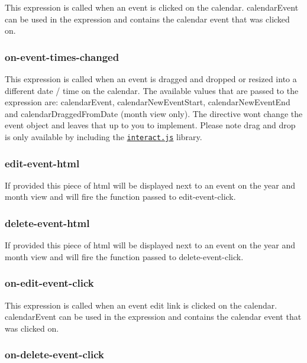 This expression is called when an event is clicked on the calendar. {\ttfamily calendar\+Event} can be used in the expression and contains the calendar event that was clicked on.

\subsubsection*{on-\/event-\/times-\/changed}

This expression is called when an event is dragged and dropped or resized into a different date / time on the calendar. The available values that are passed to the expression are\+: {\ttfamily calendar\+Event}, {\ttfamily calendar\+New\+Event\+Start}, {\ttfamily calendar\+New\+Event\+End} and {\ttfamily calendar\+Dragged\+From\+Date} (month view only). The directive won\textquotesingle{}t change the event object and leaves that up to you to implement. Please note drag and drop is only available by including the \href{http://interactjs.io/}{\tt interact.\+js} library.

\subsubsection*{edit-\/event-\/html}

If provided this piece of html will be displayed next to an event on the year and month view and will fire the function passed to edit-\/event-\/click.

\subsubsection*{delete-\/event-\/html}

If provided this piece of html will be displayed next to an event on the year and month view and will fire the function passed to delete-\/event-\/click.

\subsubsection*{on-\/edit-\/event-\/click}

This expression is called when an event edit link is clicked on the calendar. {\ttfamily calendar\+Event} can be used in the expression and contains the calendar event that was clicked on.

\subsubsection*{on-\/delete-\/event-\/click}

